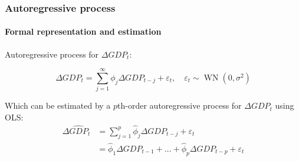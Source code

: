 \begin{frame}
    \frametitle{Autoregressive process}
    \framesubtitle{Formal representation and estimation}
    Autoregressive process for ${\Delta GDP}_t$:

    $${\Delta GDP}_t=\sum_{j=1}^\infty\phi_j {\Delta GDP}_{t-j}+\varepsilon_t,\quad\varepsilon_t\sim\operatorname{WN}(0,\sigma^2)$$

    Which can be estimated by a $p$th-order autoregressive process for ${\Delta GDP}_t$ using OLS:
    \begin{align*}
        {\Delta \hat{GDP}}_t & =\sum_{j=1}^{p}\hat{\phi}_j {\Delta GDP}_{t-j}+\varepsilon_t                              \\
                             & =\hat{\phi}_{1}{\Delta GDP}_{t-1}+\ldots+\hat{\phi}_{p}{\Delta GDP}_{t-p}+\varepsilon_{t}
    \end{align*}
\end{frame}